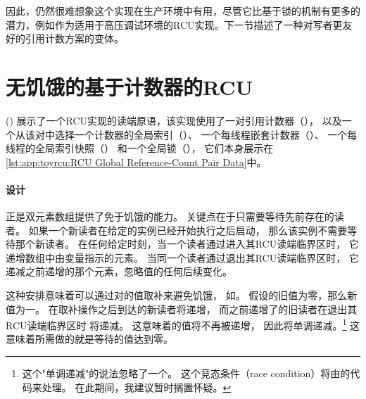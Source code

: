 因此，仍然很难想象这个实现在生产环境中有用，尽管它比基于锁的机制有更多的潜力，例如作为适用于高压调试环境的RCU实现。下一节描述了一种对写者更友好的引用计数方案的变体。

\section{无饥饿的基于计数器的RCU}
\label{sec:app:toyrcu:Starvation-Free Counter-Based RCU}

()
展示了一个RCU实现的读端原语，该实现使用了一对引用计数器（），
以及一个从该对中选择一个计数器的全局索引（）、
一个每线程嵌套计数器（）、
一个每线程的全局索引快照（）
和一个全局锁（），
它们本身展示在
\cref{lst:app:toyrcu:RCU Global Reference-Count Pair Data}中。

\begin{listing}

\caption{RCU全局引用计数对数据}
\label{lst:app:toyrcu:RCU Global Reference-Count Pair Data}
\end{listing}

\begin{listing}

\caption{使用全局引用计数对的RCU读端}
\label{lst:app:toyrcu:RCU Read-Side Using Global Reference-Count Pair}
\end{listing}

\paragraph{设计}

正是双元素数组提供了免于饥饿的能力。
关键点在于只需要等待先前存在的读者。
如果一个新读者在给定的实例已经开始执行之后启动，
那么该实例不需要等待那个新读者。
在任何给定时刻，当一个读者通过进入其RCU读端临界区时，
它递增数组中由变量指示的元素。
当同一个读者通过退出其RCU读端临界区时，
它递减之前递增的那个元素，忽略值的任何后续变化。

这种安排意味着可以通过对的值取补来避免饥饿，
如。
假设的旧值为零，那么新值为一。
在取补操作之后到达的新读者将递增，
而之前递增了的旧读者在退出其RCU读端临界区时
将递减。
这意味着的值将不再被递增，
因此将单调递减。\footnote{
	这个"单调递减"的说法忽略了一个。
	这个竞态条件（race condition）将由的代码来处理。
	在此期间，我建议暂时搁置怀疑。}
这意味着所需做的就是等待的值达到零。

